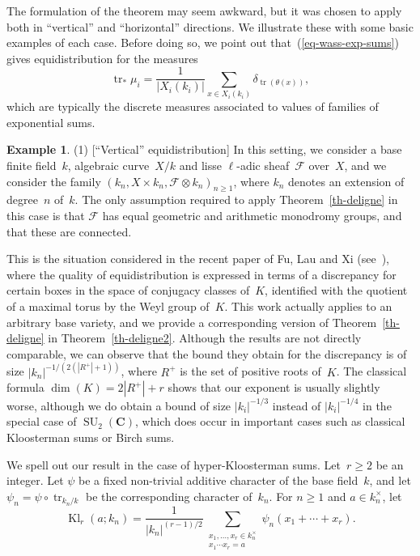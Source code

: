 \documentclass[12pt]{amsart}
\renewcommand{\mathcal}{\mathscr}
\renewcommand{\geq}{\geqslant}
\newcommand{\Cc}{\mathbf{C}}
\DeclareMathOperator{\Kl}{Kl}
\DeclareMathOperator{\Tr}{tr}
\DeclareMathOperator{\SU}{SU}
\theoremstyle{plain}
\theoremstyle{remark}
\theoremstyle{definition}
\newtheorem{example}[theorem]{Example}
\renewcommand{\geq}{\geqslant}
\begin{document}
The formulation of the theorem may seem awkward, but it was chosen to
apply both in ``vertical'' and ``horizontal'' directions. We illustrate
these with some basic examples of each case. Before doing so, we point
out that~(\ref{eq-wass-exp-sums}) gives equidistribution for the
measures
\[
  \Tr_*\mu_i=\frac{1}{|X_i(k_i)|} \sum_{x\in
    X_i(k_i)}\delta_{\Tr(\theta(x))},
\]
which are typically the discrete measures associated to values of
families of exponential sums.

\begin{example}
  (1) [``Vertical'' equidistribution] In this setting, we consider a
  base finite field~$k$, algebraic curve~$X/k$ and lisse $\ell$-adic
  sheaf~$\mathcal{F}$ over~$X$, and we consider the family
  $(k_{n},X\times k_n,\mathcal{F}\otimes k_n)_{n\geq 1}$, where $k_n$
  denotes an extension of degree~$n$ of~$k$. The only assumption
  required to apply Theorem~\ref{th-deligne} in this case is that
  $\mathcal{F}$ has equal geometric and arithmetic monodromy groups, and
  that these are connected.

  This is the situation considered in the recent paper of Fu, Lau and Xi
  (see~\cite[Th.\,1.2]{fulauxi}), where the quality of equidistribution
  is expressed in terms of a discrepancy for certain boxes in the space
  of conjugacy classes of~$K$, identified with the quotient of a maximal
  torus by the Weyl group of~$K$. This work actually applies to an
  arbitrary base variety, and we provide a corresponding version of
  Theorem~\ref{th-deligne} in Theorem~\ref{th-deligne2}. Although the
  results are not directly comparable, we can observe that the bound
  they obtain for the discrepancy is of size $|k_n|^{-1/(2(|R^+|+1))}$,
  where $R^+$ is the set of positive roots of~$K$. The classical formula
  $\dim(K)=2|R^+|+r$ shows that our exponent is usually slightly worse,
  although we do obtain a bound of size $|k_i|^{-1/3}$ instead of
  $|k_i|^{-1/4}$ in the special case of $\SU_2(\Cc)$, which does occur
  in important cases such as classical Kloosterman sums or Birch sums.

  We spell out our result in the case of hyper-Kloosterman
  sums. Let~$r\geq 2$ be an integer. Let $\psi$ be a fixed non-trivial
  additive character of the base field~$k$, and let
  $\psi_n=\psi\circ \Tr_{k_n/k}$ be the corresponding character
  of~$k_n$. For $n\geq 1$ and $a\in k_n^{\times}$, let
  \[
    \Kl_r(a;k_n)=\frac{1}{|k_n|^{(r-1)/2}} \sum_{\substack{x_1,\ldots,
          x_r\in k_n^{\times}\\x_1\cdots x_r=a}}\psi_n(x_1+\cdots+x_r).
  \]


\end{example}
\end{document}
